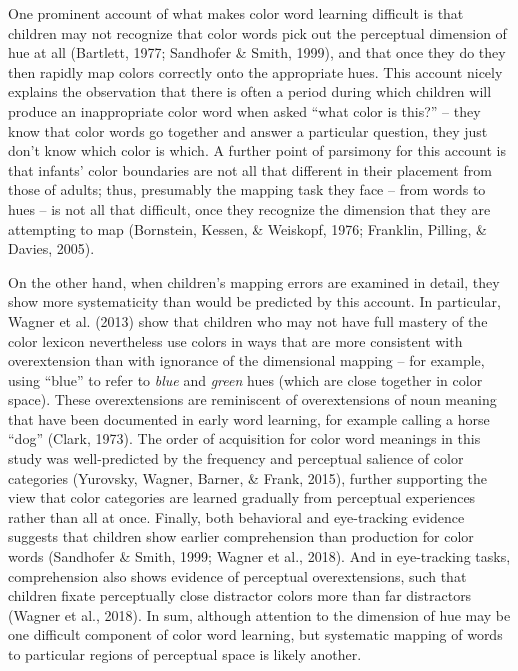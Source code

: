 \documentclass[
  english,
  ,man,floatsintext]{apa6}
\begin{document}
One prominent account of what makes color word learning difficult is that children may not recognize that color words pick out the perceptual dimension of hue at all (Bartlett, 1977; Sandhofer \& Smith, 1999), and that once they do they then rapidly map colors correctly onto the appropriate hues. This account nicely explains the observation that there is often a period during which children will produce an inappropriate color word when asked \enquote{what color is this?} -- they know that color words go together and answer a particular question, they just don't know which color is which. A further point of parsimony for this account is that infants' color boundaries are not all that different in their placement from those of adults; thus, presumably the mapping task they face -- from words to hues -- is not all that difficult, once they recognize the dimension that they are attempting to map (Bornstein, Kessen, \& Weiskopf, 1976; Franklin, Pilling, \& Davies, 2005).

On the other hand, when children's mapping errors are examined in detail, they show more systematicity than would be predicted by this account. In particular, Wagner et al. (2013) show that children who may not have full mastery of the color lexicon nevertheless use colors in ways that are more consistent with overextension than with ignorance of the dimensional mapping -- for example, using \enquote{blue} to refer to \emph{blue} and \emph{green} hues (which are close together in color space). These overextensions are reminiscent of overextensions of noun meaning that have been documented in early word learning, for example calling a horse \enquote{dog} (Clark, 1973). The order of acquisition for color word meanings in this study was well-predicted by the frequency and perceptual salience of color categories (Yurovsky, Wagner, Barner, \& Frank, 2015), further supporting the view that color categories are learned gradually from perceptual experiences rather than all at once. Finally, both behavioral and eye-tracking evidence suggests that children show earlier comprehension than production for color words (Sandhofer \& Smith, 1999; Wagner et al., 2018). And in eye-tracking tasks, comprehension also shows evidence of perceptual overextensions, such that children fixate perceptually close distractor colors more than far distractors (Wagner et al., 2018). In sum, although attention to the dimension of hue may be one difficult component of color word learning, but systematic mapping of words to particular regions of perceptual space is likely another.
\end{document}
